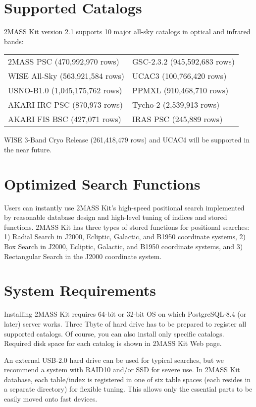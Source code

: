 \section{Supported Catalogs}

2MASS Kit version 2.1 supports 10 major all-sky catalogs in optical and infrared bands:
\begin{center}
\begin{tabular}{ll}
\hline
 2MASS PSC (470,992,970 rows)    &        GSC-2.3.2 (945,592,683 rows) \\
 WISE All-Sky (563,921,584 rows) &       UCAC3 (100,766,420 rows) \\
 USNO-B1.0 (1,045,175,762 rows) &       PPMXL (910,468,710 rows) \\
 AKARI IRC PSC (870,973 rows)    &       Tycho-2 (2,539,913 rows) \\
 AKARI FIS BSC (427,071 rows)    &       IRAS PSC (245,889 rows) \\
\hline
\end{tabular}
\end{center}
WISE 3-Band Cryo Release (261,418,479 rows) and UCAC4
will be supported in the near future.


\section{Optimized Search Functions}

Users can instantly use 2MASS Kit's high-speed positional search implemented by reasonable database design and high-level tuning of indices and stored functions. 2MASS Kit has three types of stored functions for positional searches: 1) Radial Search in J2000, Ecliptic, Galactic, and B1950 coordinate systems, 2) Box Search in J2000, Ecliptic, Galactic, and B1950 coordinate systems, and 3) Rectangular Search in the J2000 coordinate system.


\section{System Requirements}

Installing 2MASS Kit requires 64-bit or 32-bit OS on which PostgreSQL-8.4 (or later) server works. Three Tbyte of hard drive has to be prepared to register all supported catalogs. Of course, you can also install only specific catalogs. Required disk space for each catalog is shown in 2MASS Kit Web page.

An external USB-2.0 hard drive can be used for typical searches, but we recommend a system with RAID10 and/or SSD for severe use. In 2MASS Kit database, each table/index is registered in one of six table spaces (each resides in a separate directory) for flexible tuning. This allows only the essential parts to be easily moved onto fast devices.


